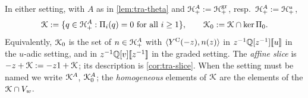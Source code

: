 \begin{defn}
\label{def:tra-slice}
In either setting, with $A$ as in \cref{lem:tra-theta} and $\mathcal{H}^A_+ := \mathcal{H}^{\mathrm{gr}}_+$, resp.\ $\mathcal{H}^A_+ := \mathcal{H}^u_+$,
\begin{equation}
\label{eq:tra-slice}
\mathcal{K} := \{q\in\mathcal{H}^A_+ : \Pi_i(q) = 0\ \text{for all } i\geq 1\},\qquad \mathcal{K}_{0} := \mathcal{K}\cap\ker\Pi_0 .
\end{equation}
Equivalently, $\mathcal{K}_{0}$ is the set of $n\in\mathcal{H}^A_+$ with $\langle Y^{\mathrm{C}}(-z),n(z)\rangle$ in $z^{-1}\mathbb{Q}[z^{-1}][\![ u ]\!]$ in the $u$-adic setting, and in $z^{-1}\mathbb{Q}[v][\![ z^{-1} ]\!]$ in the graded setting. The \emph{affine slice} is $-z+\mathcal{K} := -z1+\mathcal{K}$; its description is \cref{cor:tra-slice}. When the setting must be named we write $\mathcal{K}^A$, $\mathcal{K}_{0}^A$; the \emph{homogeneous} elements of $\mathcal{K}$ are the elements of the $\mathcal{K}\cap V_w$.
\end{defn}


